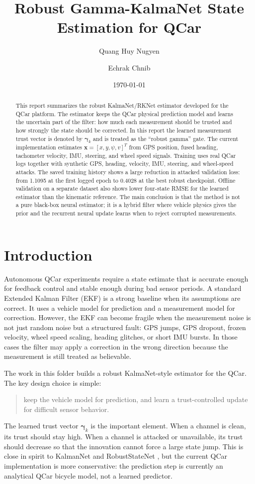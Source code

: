 \documentclass[11pt,a4paper]{article}
\title{\vspace{-1em}Robust Gamma-KalmaNet State Estimation for QCar}
\author{Quang Huy Nugyen \and Echrak Chnib}
\date{\today}
\newcommand{\state}{\bm{x}}
\newcommand{\trust}{\bm{\gamma}}
\begin{document}
\maketitle

\begin{abstract}
This report summarizes the robust KalmaNet/RKNet estimator developed for the
QCar platform. The estimator keeps the QCar physical prediction model and
learns the uncertain part of the filter: how much each measurement should be
trusted and how strongly the state should be corrected. In this report the
learned measurement trust vector is denoted by $\trust_k$ and is treated as the
``robust gamma'' gate. The current implementation estimates
$\state=[x,y,\psi,v]^T$ from GPS position, fused heading, tachometer velocity,
IMU, steering, and wheel speed signals. Training uses real QCar logs together
with synthetic GPS, heading, velocity, IMU, steering, and wheel-speed attacks.
The saved training history shows a large reduction in attacked validation loss:
from 1.1095 at the first logged epoch to 0.4028 at the best robust checkpoint.
Offline validation on a separate dataset also shows lower four-state RMSE for
the learned estimator than the kinematic reference. The main conclusion is that
the method is not a pure black-box neural estimator; it is a hybrid filter where
vehicle physics gives the prior and the recurrent neural update learns when to
reject corrupted measurements.
\end{abstract}

\section{Introduction}

Autonomous QCar experiments require a state estimate that is accurate enough
for feedback control and stable enough during bad sensor periods. A standard
Extended Kalman Filter (EKF) is a strong baseline when its assumptions are
correct. It uses a vehicle model for prediction and a measurement model for
correction. However, the EKF can become fragile when the measurement noise is
not just random noise but a structured fault: GPS jumps, GPS dropout, frozen
velocity, wheel speed scaling, heading glitches, or short IMU bursts. In those
cases the filter may apply a correction in the wrong direction because the
measurement is still treated as believable.

The work in this folder builds a robust KalmaNet-style estimator for the QCar.
The key design choice is simple:
\begin{quote}
  keep the vehicle model for prediction, and learn a trust-controlled update
  for difficult sensor behavior.
\end{quote}
The learned trust vector $\trust_k$ is the important element. When a channel is
clean, its trust should stay high. When a channel is attacked or unavailable,
its trust should decrease so that the innovation cannot force a large state
jump. This is close in spirit to KalmanNet \cite{revach2022kalmannet} and
RobustStateNet \cite{dahal2024robuststatenet}, but the current QCar
implementation is more conservative: the prediction step is currently an
analytical QCar bicycle model, not a learned predictor.
\end{document}
